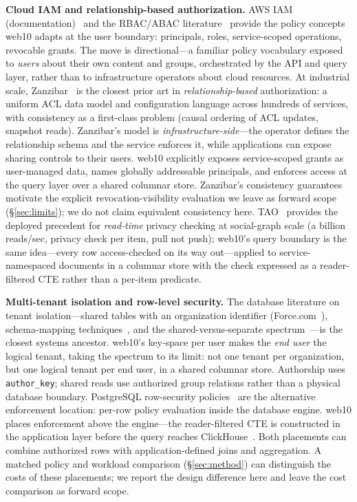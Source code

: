 \documentclass[sigconf, nonacm]{acmart}
\begin{document}
\textbf{Cloud IAM and relationship-based authorization.}
AWS IAM (documentation)~\cite{awsiam} and the RBAC/ABAC
literature~\cite{ferraiolo1992, sandhu1996, abac2014} provide the policy
concepts web10 adapts at the user boundary: principals, roles, service-scoped
operations, revocable grants. The move is directional---a familiar policy
vocabulary exposed to \emph{users} about their own content and groups,
orchestrated by the API and query layer, rather than to infrastructure
operators about cloud resources. At industrial scale, Zanzibar~\cite{zanzibar2019}
is the closest prior art in \emph{relationship-based} authorization: a uniform
ACL data model and configuration language across hundreds of services, with
consistency as a first-class problem (causal ordering of ACL updates, snapshot
reads). Zanzibar's model is \emph{infrastructure-side}---the operator defines
the relationship schema and the service enforces it, while applications can
expose sharing controls to their users. web10 explicitly exposes service-scoped
grants as user-managed data, names globally addressable principals, and enforces
access at the query layer over a shared columnar store. Zanzibar's consistency
guarantees motivate the explicit revocation-visibility evaluation we leave as
forward scope (\S\ref{sec:limits}); we do not claim equivalent consistency
here. TAO~\cite{tao2013} provides the deployed precedent for \emph{read-time}
privacy checking at social-graph scale (a billion reads/sec, privacy check per
item, pull not push); web10's query boundary is the same idea---every row
access-checked on its way out---applied to service-namespaced documents in a
columnar store with the check expressed as a reader-filtered CTE rather than a
per-item predicate.

\textbf{Multi-tenant isolation and row-level security.}
The database literature on tenant isolation---shared tables with an
organization identifier (Force.com~\cite{force2009}), schema-mapping
techniques~\cite{aulbach2008}, and the shared-versus-separate
spectrum~\cite{jacobs2007}---is the closest systems ancestor. web10's
key-space per user makes the \emph{end user} the logical tenant, taking the
spectrum to its limit: not one tenant per organization, but one logical tenant
per end user, in a shared columnar store. Authorship uses
\texttt{author\_key}; shared reads use authorized group relations rather than
a physical database boundary. PostgreSQL row-security
policies~\cite{postgres-rls} are the alternative enforcement location: per-row
policy evaluation inside the database engine. web10 places enforcement above
the engine---the reader-filtered CTE is constructed in the application layer
before the query reaches ClickHouse~\cite{clickhouse2024}. Both placements can
combine authorized rows with application-defined joins and aggregation.
A matched policy and workload comparison (\S\ref{sec:method}) can distinguish
the costs of these placements; we report the design difference here and leave
the cost comparison as forward scope.
\end{document}
